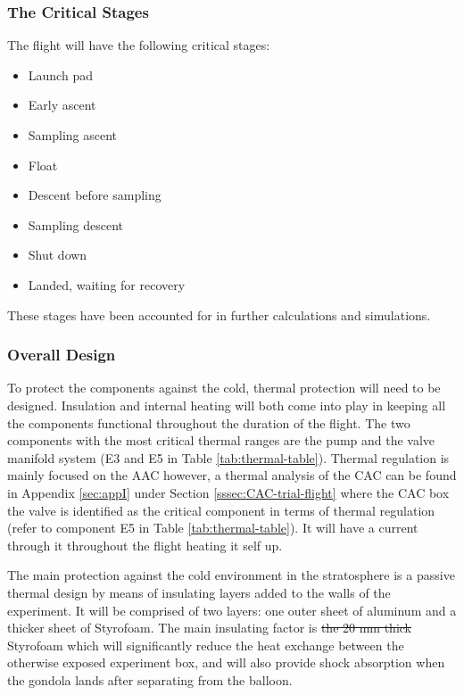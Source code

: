 \documentclass[a4paper,12pt,twoside]{article}
\providecommand{\DIFdeltex}[1]{{\protect\color{red}\sout{#1}}}                      %
\providecommand{\DIFdelbegin}{} %
\providecommand{\DIFdelend}{} %
\providecommand{\DIFdel}[1]{\texorpdfstring{\DIFdeltex{#1}}{}} %
\newcommand{\DIFscaledelfig}{0.5}
\newlength{\DIFdelgraphicswidth} %
\newlength{\DIFdelgraphicsheight} %
\newcommand{\DIFdelincludegraphics}[2][]{%
\sbox{\DIFdelgraphicsbox}{\DIFOincludegraphics[#1]{#2}}%
\settoboxwidth{\DIFdelgraphicswidth}{\DIFdelgraphicsbox} %
\settoboxtotalheight{\DIFdelgraphicsheight}{\DIFdelgraphicsbox} %
\scalebox{\DIFscaledelfig}{%
\parbox[b]{\DIFdelgraphicswidth}{\usebox{\DIFdelgraphicsbox}\\[-\baselineskip] \rule{\DIFdelgraphicswidth}{0em}}\llap{\resizebox{\DIFdelgraphicswidth}{\DIFdelgraphicsheight}{%
\setlength{\unitlength}{\DIFdelgraphicswidth}%
\begin{picture}(1,1)%
\thicklines\linethickness{2pt} %
{\color[rgb]{1,0,0}\put(0,0){\framebox(1,1){}}}%
{\color[rgb]{1,0,0}\put(0,0){\line( 1,1){1}}}%
{\color[rgb]{1,0,0}\put(0,1){\line(1,-1){1}}}%
\end{picture}%
}\hspace*{3pt}}} %
} %
\DeclareRobustCommand{\DIFdelbegin}{\DIFOdelbegin \let\includegraphics\DIFdelincludegraphics} %
\DeclareRobustCommand{\DIFdelend}{\DIFOaddend \let\includegraphics\DIFOincludegraphics} %
\begin{document}
\subsubsection{The Critical Stages}
The flight will have the following critical stages:
\begin{itemize}
    \item Launch pad
    \item Early ascent
    \item Sampling ascent
    \item Float
    \item Descent before sampling
    \item Sampling descent
    \item Shut down
    \item Landed, waiting for recovery
\end{itemize}
These stages have been accounted for in further calculations and simulations.

\subsubsection{Overall Design}
To protect the components against the cold, thermal protection will need to be designed. Insulation and internal heating will both come into play in keeping all the components functional throughout the duration of the flight. The two components with the most critical thermal ranges are the pump and the valve manifold system (E3 and E5 in Table \ref{tab:thermal-table}). Thermal regulation is mainly focused on the AAC however, a thermal analysis of the CAC can be found in Appendix \ref{sec:appI} under Section \ref{sssec:CAC-trial-flight} where the  CAC box the valve is identified as the critical component in terms of thermal regulation (refer to component E5 in Table \ref{tab:thermal-table}). It will have a current through it throughout the flight heating it self up.

The main protection against the cold environment in the stratosphere is a passive thermal design by means of  insulating layers added to the walls of the experiment. It will be comprised of two layers: one outer sheet of aluminum and a thicker sheet of Styrofoam. The main insulating factor is \DIFdelbegin \DIFdel{the 20 mm thick }\DIFdelend Styrofoam which will significantly reduce the heat exchange between the otherwise exposed experiment box, and will also provide shock absorption when the gondola lands after separating from the balloon.
\end{document}
